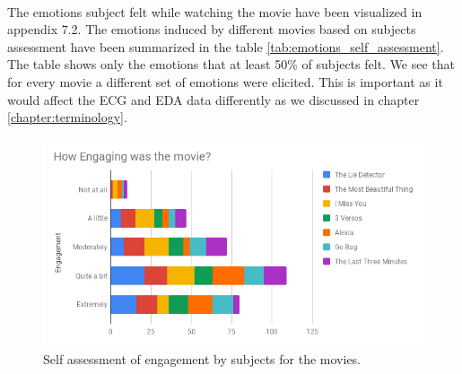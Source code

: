 \paragraph{}
The emotions subject felt while watching the movie have been visualized in appendix 7.2. The emotions induced by different movies based on subjects assessment have been summarized in the table \ref{tab:emotions_self_assessment}. The table shows only the emotions that at least 50\% of subjects felt. We see that for every movie a different set of emotions were elicited. This is important as it would affect the ECG and EDA data differently as we discussed in chapter \ref{chapter:terminology}. 
\begin{center}
\label{tab:emotions_self_assessment}

\end{center}

\begin{figure}
\centering
\includegraphics[width=140mm]{Figures/engagement.png}
\caption{Self assessment of engagement by subjects for the movies.}
\label{fig:engagement_movies}
\end{figure}

